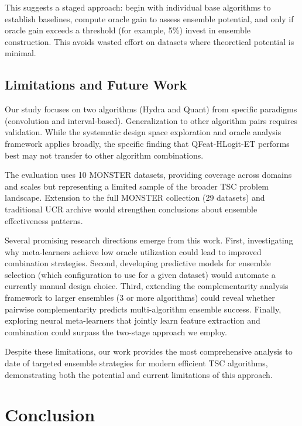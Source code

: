 \documentclass[pdflatex,sn-basic]{sn-jnl}           %
\theoremstyle{thmstyleone}%
\theoremstyle{thmstyletwo}%
\theoremstyle{thmstylethree}%
\begin{document}
This suggests a staged approach: begin with individual base algorithms to establish baselines, compute oracle gain to assess ensemble potential, and only if oracle gain exceeds a threshold (for example, 5\%) invest in ensemble construction. This avoids wasted effort on datasets where theoretical potential is minimal.

\subsection{Limitations and Future Work}

Our study focuses on two algorithms (Hydra and Quant) from specific paradigms (convolution and interval-based). Generalization to other algorithm pairs requires validation. While the systematic design space exploration and oracle analysis framework applies broadly, the specific finding that QFeat-HLogit-ET performs best may not transfer to other algorithm combinations.

The evaluation uses 10 MONSTER datasets, providing coverage across domains and scales but representing a limited sample of the broader TSC problem landscape. Extension to the full MONSTER collection (29 datasets) and traditional UCR archive would strengthen conclusions about ensemble effectiveness patterns.

Several promising research directions emerge from this work. First, investigating why meta-learners achieve low oracle utilization could lead to improved combination strategies. Second, developing predictive models for ensemble selection (which configuration to use for a given dataset) would automate a currently manual design choice. Third, extending the complementarity analysis framework to larger ensembles (3 or more algorithms) could reveal whether pairwise complementarity predicts multi-algorithm ensemble success. Finally, exploring neural meta-learners that jointly learn feature extraction and combination could surpass the two-stage approach we employ.

Despite these limitations, our work provides the most comprehensive analysis to date of targeted ensemble strategies for modern efficient TSC algorithms, demonstrating both the potential and current limitations of this approach.

\clearpage

\section{Conclusion}\label{sec13}
\end{document}
